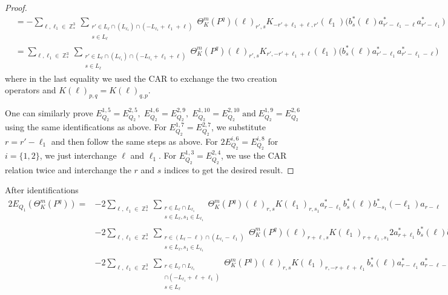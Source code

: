 \documentclass[sn-mathphys, Numbered ,a4paper]{sn-jnl}%
\DeclareMathOperator{\Z}{\mathbb{Z}}
\theoremstyle{plain}
\theoremstyle{definition}
\theoremstyle{remark}
\theoremstyle{plain}
\theoremstyle{definition}
\theoremstyle{remark}
\begin{document}
\begin{proof}
\begin{align}
		&=-\sum\limits_{\ell, \ell_1\in \Z^3_*}\sum\limits_{\substack{r' \in  L_{\ell} \cap (L_{\ell_1}) \cap (-L_{\ell_1}+\ell_1+\ell)\\ s \in L_{\ell}}} \Theta^m_K(P^q)(\ell)_{r',s} K_{-r'+\ell_1+\ell,r'}(\ell_1)\Big( b^*_{s}(\ell) a^*_{r'-\ell_1-\ell}a^*_{r'-\ell_1}\Big)\nonumber\\
		&=\sum\limits_{\ell, \ell_1\in \Z^3_*}\sum\limits_{\substack{r' \in  L_{\ell} \cap (L_{\ell_1}) \cap (-L_{\ell_1}+\ell_1+\ell)\\ s \in L_{\ell}}} \Theta^m_K(P^q)(\ell)_{r',s} K_{r',-r'+\ell_1+\ell}(\ell_1)\Big( b^*_{s}(\ell) a^*_{r'-\ell_1} a^*_{r'-\ell_1-\ell}\Big)\label{eq:EQ122} 
	\end{align}
	where in the last equality we used the CAR to exchange the two creation operators and $K(\ell)_{p,q}=K(\ell)_{q,p}$. 
	
	One can similarly prove $E_{Q_2}^{1,5}\!=\! E_{Q_2}^{2,5},\; E_{Q_2}^{1,6}\!=\! E_{Q_2}^{2,9},\; E_{Q_2}^{1,10}\!=\!E_{Q_2}^{2,10}\;\mathrm{and}\; E_{Q_2}^{1,9}\! =\! E_{Q_2}^{2,6}$ using the same identifications as above. 
	For $ E_{Q_2}^{1,7}\! =\! E_{Q_2}^{2,7}$, we substitute $r=r'-\ell_1$  and then follow the same steps as above.
	For $ 2E_{Q_2}^{i,6}\! =\! E_{Q_2}^{i,8}$ for $i=\{1,2\}$, we just interchange $\ell$ and $\ell_1$.   
	For $E_{Q_2}^{1,3}\! =\! E_{Q_2}^{2,4} $, we use the CAR relation twice and interchange the $r$ and $s$ indices to get the desired result.
\end{proof}
After identifications
\begin{alignat}{2}
	E_{Q_1}(\Theta^m_{K}(P^q)) = &- 2
	\sum\limits_{\ell, \ell_1\in \Z^3_*}\sum\limits_{\substack{r\in L_{\ell} \cap L_{\ell_1}\\ s \in L_{\ell},s_1\in L_{\ell_1}}} \Theta^m_{K}(P^q)(\ell)_{r,s} K(\ell_1)_{r,s_1} a^*_{r-\ell_1} b^*_{s}(\ell) b^*_{-s_1}(-\ell_1) a_{r-\ell} 
	\nonumber\\
	& -2\sum\limits_{\ell, \ell_1\in \Z^3_*}\sum\limits_{\substack{r\in (L_{\ell}-\ell) \cap (L_{\ell_1}-\ell_1)\\ s \in L_{\ell},s_1\in L_{\ell_1} }} \Theta^m_{K}(P^q)(\ell)_{r+\ell,s}K(\ell_1)_{r+\ell_1,s_1}
	2a^*_{r+\ell_1}b^*_{s}(\ell) b^*_{-s_1}(-\ell_1) a_{r+\ell}
 \nonumber\\
	&-2 	\sum\limits_{\ell, \ell_1\in \Z^3_*}\sum\limits_{\substack{r\in L_{\ell} \cap L_{\ell_1}\\\cap (-L_{\ell_1}+\ell+\ell_1)\\ s \in L_{\ell}}} \Theta^m_{K}(P^q)(\ell)_{r,s}K(\ell_1)_{r,-r+\ell+\ell_1} b^*_{s}(\ell) a^*_{r-\ell_1}a^*_{r-\ell-\ell_1}	+\mathrm{h.c.} \label{eq:expandedEQ1}
\end{alignat}
\end{document}
